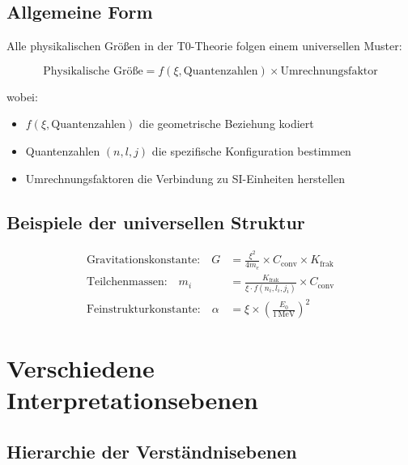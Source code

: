 \documentclass[12pt,a4paper]{article}
\begin{document}
	\subsection{Allgemeine Form}
	
	Alle physikalischen Größen in der T0-Theorie folgen einem universellen Muster:
	
	\begin{equation}
		\boxed{\text{Physikalische Größe} = f(\xi, \text{Quantenzahlen}) \times \text{Umrechnungsfaktor}}
		\label{eq:universal_pattern}
	\end{equation}
	
	wobei:
	\begin{itemize}
		\item $f(\xi, \text{Quantenzahlen})$ die geometrische Beziehung kodiert
		\item Quantenzahlen $(n,l,j)$ die spezifische Konfiguration bestimmen
		\item Umrechnungsfaktoren die Verbindung zu SI-Einheiten herstellen
	\end{itemize}
	
	\subsection{Beispiele der universellen Struktur}
	
	\begin{align}
		\text{Gravitationskonstante:} \quad G &= \frac{\xi^2}{4m_e} \times C_{\text{conv}} \times K_{\text{frak}} \\
		\text{Teilchenmassen:} \quad m_i &= \frac{K_{\text{frak}}}{\xi \cdot f(n_i,l_i,j_i)} \times C_{\text{conv}} \\
		\text{Feinstrukturkonstante:} \quad \alpha &= \xi \times \left(\frac{E_0}{1\,\mathrm{MeV}}\right)^2
	\end{align}
	
	\section{Verschiedene Interpretationsebenen}
	
	\subsection{Hierarchie der Verständnisebenen}
	
\end{document}
